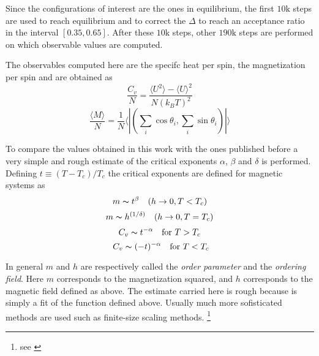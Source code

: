 
Since the configurations of interest are the ones in equilibrium, the first $10\text{k}$
steps are used to reach equilibrium and to correct the $\Delta$ to reach an acceptance
ratio in the interval $[0.35,0.65]$. After these $10\text{k}$ steps, other 
$190\text{k}$ steps are performed on which observable values are computed.

The observables computed here are the specifc heat per spin, the magnetization
per spin and are obtained as 
$$ \frac{C_v}{N} = \frac{\langle U^2 \rangle - \langle U \rangle^2}{N (k_B T)^2} $$
$$ \frac{\langle M \rangle}{N} = \frac{1}{N} \big\langle | (\sum_i \cos \theta_i, 
\sum_i \sin \theta_i ) | \big\rangle$$

To compare the values obtained in this work with the ones published before a very simple
and rough estimate of the critical exponents $\alpha$, $\beta$ and $\delta$ is 
performed. Defining $t \equiv (T - T_c)/T_c$ the critical exponents are defined for
magnetic systems as
$$ m \thicksim t^{\beta} \quad (h \rightarrow 0, T < T_c)$$
$$ m \thicksim h^{(1 / \delta)} \quad (h \rightarrow 0, T=T_c)$$
$$ C_v \thicksim t^{-\alpha} \quad  \text{for}\ T > T_c$$
$$\ C_v \thicksim (-t)^{-\alpha} \quad \text{for}\ T < T_c$$

In general $m$ and $h$ are respectively called the \emph{order parameter} and the
\emph{ordering field}. Here $m$ corresponds to the magnetization squared, and $h$ 
corresponds to the magnetic field defined as above. The estimate carried here is
rough because is simply a fit of the function defined above. Usually much more
sofisticated methods are used such as finite-size scaling methods. \footnote{
see \cite{1988}}

